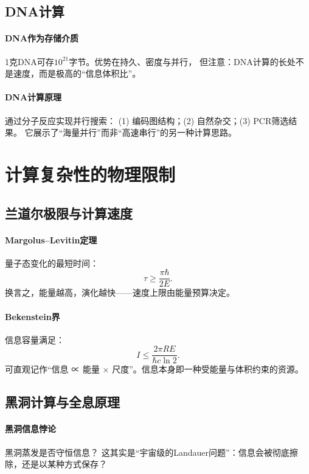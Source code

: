 \subsection{DNA计算}

\paragraph{DNA作为存储介质}
1克DNA可存$10^{21}$字节。\;优势在持久、密度与并行，  
但注意：DNA计算的长处不是速度，而是极高的“信息体积比”。

\paragraph{DNA计算原理}
通过分子反应实现并行搜索：  
(1) 编码图结构；(2) 自然杂交；(3) PCR筛选结果。  
它展示了“海量并行”而非“高速串行”的另一种计算思路。

\section{计算复杂性的物理限制}

\subsection{兰道尔极限与计算速度}

\paragraph{Margolus–Levitin定理}
量子态变化的最短时间：
$$\tau\ge\dfrac{\pi\hbar}{2E}.$$
换言之，能量越高，演化越快——\;速度上限由能量预算决定。

\paragraph{Bekenstein界}
信息容量满足：
$$I\le\dfrac{2\pi RE}{\hbar c\ln2}.$$
可直观记作“信息 ∝ 能量 × 尺度”。\;信息本身即一种受能量与体积约束的资源。

\subsection{黑洞计算与全息原理}

\paragraph{黑洞信息悖论}
黑洞蒸发是否守恒信息？  
这其实是“宇宙级的Landauer问题”：信息会被彻底擦除，还是以某种方式保存？

